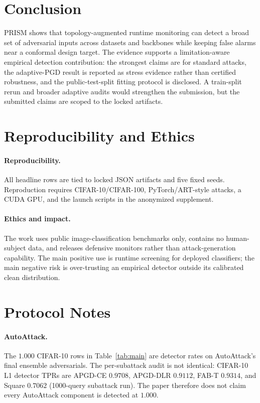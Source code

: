 \documentclass{article}
\newcommand{\prism}{\textsc{PRISM}\xspace}
\begin{document}
\section{Conclusion}
\prism shows that topology-augmented runtime monitoring can detect a broad set of adversarial inputs across datasets and backbones while keeping false alarms near a conformal design target. The evidence supports a limitation-aware empirical detection contribution: the strongest claims are for standard attacks, the adaptive-PGD result is reported as stress evidence rather than certified robustness, and the public-test-split fitting protocol is disclosed. A train-split rerun and broader adaptive audits would strengthen the submission, but the submitted claims are scoped to the locked artifacts.

\section{Reproducibility and Ethics}
\paragraph{Reproducibility.}
All headline rows are tied to locked JSON artifacts and five fixed seeds. Reproduction requires CIFAR-10/CIFAR-100, PyTorch/ART-style attacks, a CUDA GPU, and the launch scripts in the anonymized supplement.

\paragraph{Ethics and impact.}
The work uses public image-classification benchmarks only, contains no human-subject data, and releases defensive monitors rather than attack-generation capability. The main positive use is runtime screening for deployed classifiers; the main negative risk is over-trusting an empirical detector outside its calibrated clean distribution.




\appendix
\section{Protocol Notes}
\paragraph{AutoAttack.}
The $1.000$ CIFAR-10 rows in Table~\ref{tab:main} are detector rates on AutoAttack's final ensemble adversarials. The per-subattack audit is not identical: CIFAR-10 L1 detector TPRs are APGD-CE $0.9708$, APGD-DLR $0.9112$, FAB-T $0.9314$, and Square $0.7062$ (1000-query subattack run). The paper therefore does not claim every AutoAttack component is detected at $1.000$.
\end{document}
